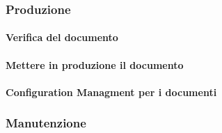     \subsubsection{Produzione}
        \paragraph{Verifica del documento} \label{sec:doc_verification}

        \paragraph{Mettere in produzione il documento}


        \paragraph{Configuration Managment per i documenti}

    \subsubsection{Manutenzione} \label{sec:doc_maintenance}